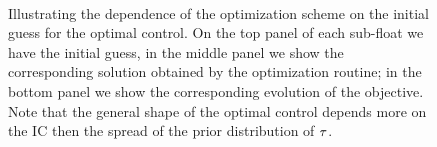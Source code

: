 \begin{figure}[h]
\begin{center}  
\\
\caption[Dependence on initial guess for control]{Illustrating the dependence
of the optimization scheme on the initial guess for the optimal control. 
On the top panel of each sub-float we have the initial guess, in the middle
panel we show the corresponding solution obtained by the optimization routine;
in the bottom panel we show the corresponding evolution of the objective. Note
that the general shape of the optimal control depends more on the IC then the
spread of the prior distribution of ${ \tau }$.}
\label{fig:ICs_for_control}
\end{center}
\end{figure}


